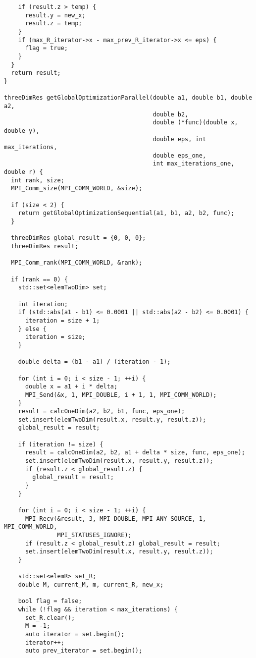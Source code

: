 \documentclass{report}
\begin{document}
\begin{lstlisting}
    if (result.z > temp) {
      result.y = new_x;
      result.z = temp;
    }
    if (max_R_iterator->x - max_prev_R_iterator->x <= eps) {
      flag = true;
    }
  }
  return result;
}

threeDimRes getGlobalOptimizationParallel(double a1, double b1, double a2,
                                          double b2,
                                          double (*func)(double x, double y),
                                          double eps, int max_iterations,
                                          double eps_one,
                                          int max_iterations_one, double r) {
  int rank, size;
  MPI_Comm_size(MPI_COMM_WORLD, &size);

  if (size < 2) {
    return getGlobalOptimizationSequential(a1, b1, a2, b2, func);
  }

  threeDimRes global_result = {0, 0, 0};
  threeDimRes result;

  MPI_Comm_rank(MPI_COMM_WORLD, &rank);

  if (rank == 0) {
    std::set<elemTwoDim> set;

    int iteration;
    if (std::abs(a1 - b1) <= 0.0001 || std::abs(a2 - b2) <= 0.0001) {
      iteration = size + 1;
    } else {
      iteration = size;
    }

    double delta = (b1 - a1) / (iteration - 1);

    for (int i = 0; i < size - 1; ++i) {
      double x = a1 + i * delta;
      MPI_Send(&x, 1, MPI_DOUBLE, i + 1, 1, MPI_COMM_WORLD);
    }
    result = calcOneDim(a2, b2, b1, func, eps_one);
    set.insert(elemTwoDim(result.x, result.y, result.z));
    global_result = result;

    if (iteration != size) {
      result = calcOneDim(a2, b2, a1 + delta * size, func, eps_one);
      set.insert(elemTwoDim(result.x, result.y, result.z));
      if (result.z < global_result.z) {
        global_result = result;
      }
    }

    for (int i = 0; i < size - 1; ++i) {
      MPI_Recv(&result, 3, MPI_DOUBLE, MPI_ANY_SOURCE, 1, MPI_COMM_WORLD,
               MPI_STATUSES_IGNORE);
      if (result.z < global_result.z) global_result = result;
      set.insert(elemTwoDim(result.x, result.y, result.z));
    }

    std::set<elemR> set_R;
    double M, current_M, m, current_R, new_x;

    bool flag = false;
    while (!flag && iteration < max_iterations) {
      set_R.clear();
      M = -1;
      auto iterator = set.begin();
      iterator++;
      auto prev_iterator = set.begin();


\end{lstlisting}
\end{document}
